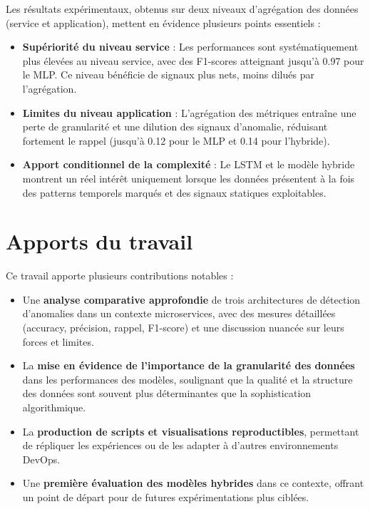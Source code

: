 \documentclass[a4paper,12pt]{report}
\begin{document}
Les résultats expérimentaux, obtenus sur deux niveaux d’agrégation des données (service et application), mettent en évidence plusieurs points essentiels :
\begin{itemize}
    \item \textbf{Supériorité du niveau service} : Les performances sont systématiquement plus élevées au niveau service, avec des F1-scores atteignant jusqu’à 0.97 pour le MLP. Ce niveau bénéficie de signaux plus nets, moins dilués par l’agrégation.
    \item \textbf{Limites du niveau application} : L’agrégation des métriques entraîne une perte de granularité et une dilution des signaux d’anomalie, réduisant fortement le rappel (jusqu’à 0.12 pour le MLP et 0.14 pour l’hybride).
    \item \textbf{Apport conditionnel de la complexité} : Le LSTM et le modèle hybride montrent un réel intérêt uniquement lorsque les données présentent à la fois des patterns temporels marqués et des signaux statiques exploitables.
\end{itemize}

\section*{Apports du travail}
Ce travail apporte plusieurs contributions notables :
\begin{itemize}
    \item Une \textbf{analyse comparative approfondie} de trois architectures de détection d’anomalies dans un contexte microservices, avec des mesures détaillées (accuracy, précision, rappel, F1-score) et une discussion nuancée sur leurs forces et limites.
    \item La \textbf{mise en évidence de l’importance de la granularité des données} dans les performances des modèles, soulignant que la qualité et la structure des données sont souvent plus déterminantes que la sophistication algorithmique.
    \item La \textbf{production de scripts et visualisations reproductibles}, permettant de répliquer les expériences ou de les adapter à d’autres environnements DevOps.
    \item Une \textbf{première évaluation des modèles hybrides} dans ce contexte, offrant un point de départ pour de futures expérimentations plus ciblées.
\end{itemize}
\end{document}
